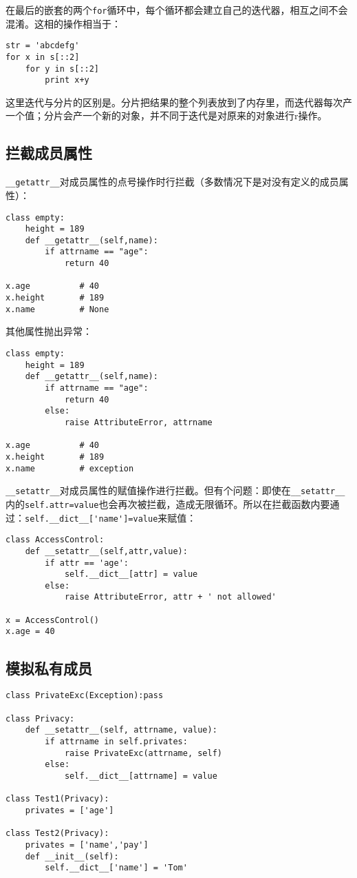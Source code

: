 在最后的嵌套的两个\verb|for|循环中，每个循环都会建立自己的迭代器，相互之间不会混淆。这相的操作相当于：

\begin{lstlisting}
str = 'abcdefg'
for x in s[::2]
	for y in s[::2]
		print x+y
\end{lstlisting}

这里迭代与分片的区别是。分片把结果的整个列表放到了内存里，而迭代器每次产一个值；分片会产一个新的对象，并不同于迭代是对原来的对象进行r操作。

\subsection{拦截成员属性}

\verb|__getattr__|对成员属性的点号操作时行拦截（多数情况下是对没有定义的成员属性）：

\begin{lstlisting}
class empty:
	height = 189
	def __getattr__(self,name):
		if attrname == "age":
			return 40

x.age          # 40
x.height       # 189
x.name         # None
\end{lstlisting}

其他属性抛出异常：

\begin{lstlisting}
class empty:
	height = 189
	def __getattr__(self,name):
		if attrname == "age":
			return 40
		else:
			raise AttributeError, attrname

x.age          # 40
x.height       # 189
x.name         # exception
\end{lstlisting}

\verb|__setattr__|对成员属性的赋值操作进行拦截。但有个问题：即使在\verb|__setattr__|内的\verb|self.attr=value|也会再次被拦截，造成无限循环。所以在拦截函数内要通过：\verb|self.__dict__['name']=value|来赋值：

\begin{lstlisting}
class AccessControl:
	def __setattr__(self,attr,value):
		if attr == 'age':
			self.__dict__[attr] = value
		else:
			raise AttributeError, attr + ' not allowed'

x = AccessControl()
x.age = 40
\end{lstlisting}

\subsection{模拟私有成员}

\begin{lstlisting}
class PrivateExc(Exception):pass

class Privacy:
	def __setattr__(self, attrname, value):
		if attrname in self.privates:
			raise PrivateExc(attrname, self)
		else:
			self.__dict__[attrname] = value

class Test1(Privacy):
	privates = ['age']

class Test2(Privacy):
	privates = ['name','pay']
	def __init__(self):
		self.__dict__['name'] = 'Tom'
\end{lstlisting}

